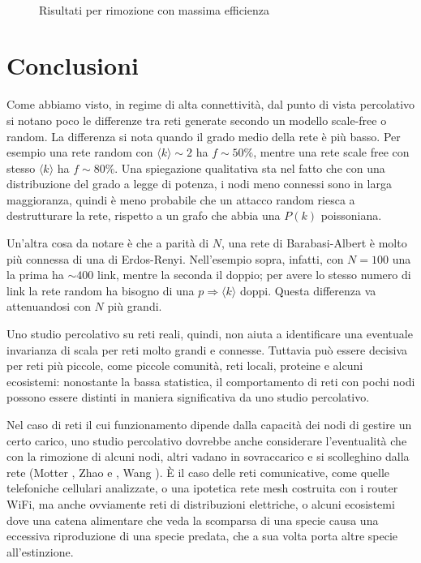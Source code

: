\begin{figure}[p!]
	$\;$
	\caption[Risultati attacco.]{Risultati per rimozione con massima efficienza}
	\label{fig:atak}
\end{figure}
\clearpage
\section{Conclusioni}
Come abbiamo visto, in regime di alta connettività, dal punto di vista percolativo si notano poco le differenze tra reti generate secondo un modello scale-free o random. La differenza si nota quando il grado medio della rete è più basso. Per esempio una rete random con $\langle k \rangle \sim 2$ ha $f\sim 50\%$, mentre una rete scale free con stesso $\langle k \rangle$ ha $f\sim 80\%$. Una spiegazione qualitativa sta nel fatto che con una distribuzione del grado a legge di potenza, i nodi meno connessi sono in larga maggioranza, quindi è meno probabile che un attacco random riesca a destrutturare la rete, rispetto a un grafo che abbia una $P(k)$ poissoniana. 

Un'altra cosa da notare è che a parità di $N$, una rete di Barabasi-Albert è molto più connessa di una di Erdos-Renyi. Nell'esempio sopra, infatti, con $N=100$ una la prima ha $\sim400$ link, mentre la seconda il doppio; per avere lo stesso numero di link la rete random ha bisogno di una $p \Rightarrow \langle k \rangle$ doppi. Questa differenza va attenuandosi con $N$ più grandi.

Uno studio percolativo su reti reali, quindi, non aiuta a identificare una eventuale invarianza di scala per reti molto grandi e connesse. Tuttavia può essere decisiva per reti più piccole, come piccole comunità, reti locali, proteine e alcuni ecosistemi: nonostante la bassa statistica, il comportamento di reti con pochi nodi possono essere distinti in maniera significativa da uno studio percolativo.

Nel caso di reti il cui funzionamento dipende dalla capacità dei nodi di gestire un certo carico, uno studio percolativo dovrebbe anche considerare l'eventualità che con la rimozione di alcuni nodi, altri vadano in sovraccarico e si scolleghino dalla rete (Motter \citeyear{Motter2002}, Zhao \citeyear{Zhao2004} e \citeyear{Zhao2005}, Wang \citeyear{Wang2009}). È il caso delle reti comunicative, come quelle telefoniche cellulari analizzate, o una ipotetica rete mesh costruita con i router WiFi, ma anche ovviamente reti di distribuzioni elettriche, 
o alcuni ecosistemi dove una catena alimentare che veda la scomparsa di una specie causa una eccessiva riproduzione di una specie predata, che a sua volta porta altre specie all'estinzione.

